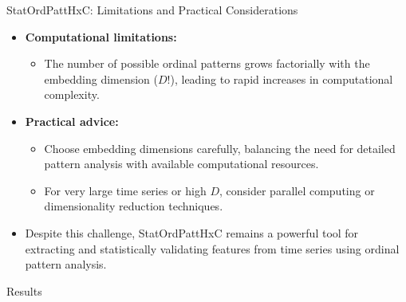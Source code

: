 \documentclass{beamer}
\begin{document}
\begin{frame}{StatOrdPattHxC: Limitations and Practical Considerations}
	\begin{itemize}
		\item \textbf{Computational limitations:}
		\begin{itemize}
			\item The number of possible ordinal patterns grows factorially with the embedding dimension ($D!$), leading to rapid increases in computational complexity.
		\end{itemize}
		\item \textbf{Practical advice:}
		\begin{itemize}
			\item Choose embedding dimensions carefully, balancing the need for detailed pattern analysis with available computational resources.
			\item For very large time series or high $D$, consider parallel computing or dimensionality reduction techniques.
		\end{itemize}
		\item Despite this challenge, StatOrdPattHxC remains a powerful tool for extracting and statistically validating features from time series using ordinal pattern analysis.
	\end{itemize}
\end{frame}

\begin{frame}
	\begin{center}
		\alert{Results}
	\end{center}
\end{frame}

\end{document}
